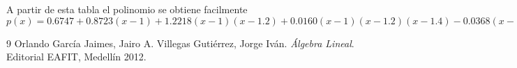 \documentclass[12pt]{article}
\begin{document}
        A partir de esta tabla el polinomio se obtiene facilmente\\
        $p(x) = 0.6747 + 0.8723(x - 1) + 1.2218(x - 1)(x - 1.2) + 0.0160(x - 1)(x - 1.2)(x - 1.4) - 0.0368(x - 1)(x - 1.2)(x - 1.4)(x - 1.6) + 0.0195(x - 1)(x - 1.2)(x- 1.4)(x - 1.6)(x - 1.8)(x -2)$\\    
        
        

        \begin{thebibliography}{9}
            Orlando García Jaimes, Jairo A. Villegas Gutiérrez, Jorge Iván. \textit{Álgebra Lineal}. Editorial EAFIT, Medellín 2012. 
        \end{thebibliography}
    
\end{document}
